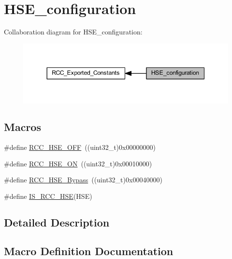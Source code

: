 \hypertarget{group___h_s_e__configuration}{}\section{H\+S\+E\+\_\+configuration}
\label{group___h_s_e__configuration}
Collaboration diagram for H\+S\+E\+\_\+configuration\+:
\nopagebreak
\begin{figure}[H]
\begin{center}
\leavevmode
\includegraphics[width=344pt]{group___h_s_e__configuration}
\end{center}
\end{figure}
\subsection*{Macros}
\begin{DoxyCompactItemize}
\item 
\#define \hyperlink{group___h_s_e__configuration_ga1616626d23fbce440398578855df6f97}{R\+C\+C\+\_\+\+H\+S\+E\+\_\+\+O\+FF}~((uint32\+\_\+t)0x00000000)
\item 
\#define \hyperlink{group___h_s_e__configuration_gabc4f70a44776c557af20496b04d9a9db}{R\+C\+C\+\_\+\+H\+S\+E\+\_\+\+ON}~((uint32\+\_\+t)0x00010000)
\item 
\#define \hyperlink{group___h_s_e__configuration_ga09061e9909d5f588baa7bfb0f7edd9fa}{R\+C\+C\+\_\+\+H\+S\+E\+\_\+\+Bypass}~((uint32\+\_\+t)0x00040000)
\item 
\#define \hyperlink{group___h_s_e__configuration_ga287bbcafd73d07ec915c2f793301908a}{I\+S\+\_\+\+R\+C\+C\+\_\+\+H\+SE}(H\+SE)
\end{DoxyCompactItemize}


\subsection{Detailed Description}


\subsection{Macro Definition Documentation}
\mbox{\label{group___h_s_e__configuration_ga287bbcafd73d07ec915c2f793301908a}} 
